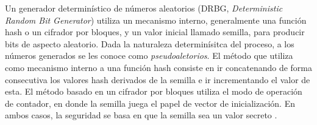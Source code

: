 
Un generador determinístico de números aleatorios (DRBG,
\textit{Deterministic Random Bit Generator}) utiliza un mecanismo interno,
generalmente una función hash o un cifrador por bloques, y un valor inicial
llamado semilla, para producir bits de aspecto aleatorio. Dada la naturaleza
determinísitca del proceso, a los números generados se les conoce como
\textit{pseudoaletorios}. El método que utiliza como mecanismo interno a una
función hash consiste en ir concatenando de forma consecutiva los valores hash
derivados de la semilla e ir incrementando el valor de esta. El método basado en
un cifrador por bloques utiliza el modo de operación de contador,
en donde la semilla juega el papel de vector de inicialización. En ambos casos,
la seguridad se basa en que la semilla sea un valor secreto
\cite{nist_aleatorios}.

